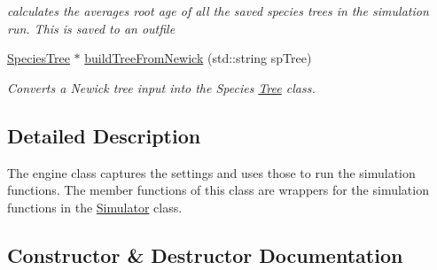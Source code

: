 \begin{DoxyCompactItemize}
\begin{DoxyCompactList}\small\item\em calculates the averages root age of all the saved species trees in the simulation run. This is saved to an outfile \end{DoxyCompactList}\item 
\mbox{\hyperlink{class_species_tree}{Species\+Tree}} $\ast$ \mbox{\hyperlink{class_engine_a0e10774c53dd9d241023ffa2f803d4dd}{build\+Tree\+From\+Newick}} (std\+::string sp\+Tree)
\begin{DoxyCompactList}\small\item\em Converts a Newick tree input into the Species \mbox{\hyperlink{class_tree}{Tree}} class. \end{DoxyCompactList}\end{DoxyCompactItemize}


\subsection{Detailed Description}
The engine class captures the settings and uses those to run the simulation functions. The member functions of this class are wrappers for the simulation functions in the \mbox{\hyperlink{class_simulator}{Simulator}} class. 

\subsection{Constructor \& Destructor Documentation}
\mbox{\label{class_engine_a8b4741a93ca42e6ef32ea49703f9ed70}} 
